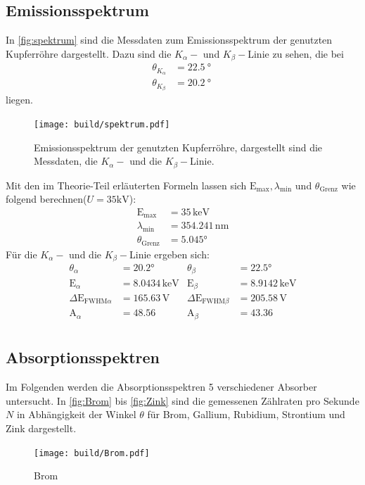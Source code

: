 \subsection{Emissionsspektrum}
In \autoref{fig:spektrum} sind die Messdaten zum Emissionsspektrum der genutzten Kupferröhre dargestellt. Dazu sind die $K_\alpha-$ und $K_\beta-$Linie zu sehen, die bei
\begin{align*}
    \theta_{K_\alpha} &= \SI{22.5}{\degree} \\
    \theta_{K_\beta}  &= \SI{20.2}{\degree} \; 
\end{align*}
liegen.
\begin{figure}[H]
  \centering
  \texttt{[image: build/spektrum.pdf]}
  \caption{Emissionsspektrum der genutzten Kupferröhre, dargestellt sind die Messdaten, die $K_\alpha-$ und die $K_\beta-$Linie.}
  \label{fig:spektrum}
\end{figure}
\noindent
Mit den im Theorie-Teil erläuterten Formeln lassen sich $\text{E}_\text{max}, \lambda_\text{min}$ und $\theta_\text{Grenz}$ wie folgend berechnen($U=35 \si{\kilo\volt}$):
\begin{align*}
  \text{E}_\text{max} &= 35 \, \mathrm{keV}\\
  \lambda_\text{min} &= 354.241 \, \mathrm{nm}\\
  \theta_\text{Grenz} &= 5.045°
\end{align*}
Für die $K_\alpha-$ und die $K_\beta-$Linie ergeben sich:
\begin{align*}
  \theta_\alpha&=20.2° & \theta_\beta&=22.5° \\
  \text{E}_\alpha&=8.0434 \, \mathrm{keV}   &\text{E}_\beta&=8.9142 \, \mathrm{keV} \\
  \Delta\text{E}_{\text{FWHM}\alpha}&=165.63 \, \mathrm{V}   &\Delta\text{E}_{\text{FWHM}\beta}&=205.58 \, \mathrm{V} \\
  \text{A}_\alpha&=48.56  &\text{A}_\beta&=43.36 \\
  \end{align*}
\subsection{Absorptionsspektren}
Im Folgenden werden die Absorptionsspektren 5 verschiedener Absorber untersucht. In \autoref{fig:Brom} bis \autoref{fig:Zink} sind die gemessenen Zählraten pro Sekunde $N$ in Abhängigkeit der Winkel $\theta$ für Brom, Gallium, Rubidium, Strontium und Zink dargestellt. 
\begin{figure}[H]
  \centering
  \texttt{[image: build/Brom.pdf]}
  \caption{Brom}
  \label{fig:Brom}
\end{figure}

